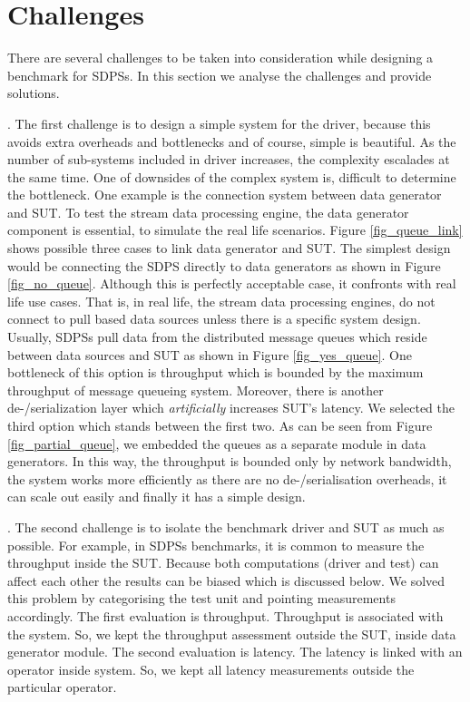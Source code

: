 \section{Challenges}
\label{chal}
There are several challenges to be taken into consideration while designing a benchmark for SDPSs. In this section we analyse the challenges and provide solutions.

. The first challenge is to design a simple system for the driver, because this avoids extra overheads and bottlenecks and of course, simple is beautiful. As the number of sub-systems included in driver increases, the complexity escalades at the same time. One of downsides of the complex system is, difficult to determine the bottleneck. One example is the connection system between data generator and SUT.  To test the stream data processing engine, the data generator component is essential, to simulate the real life scenarios. Figure \ref{fig_queue_link} shows possible three cases to link data generator and SUT. The simplest design would be connecting the SDPS directly to data generators as shown in Figure \ref{fig_no_queue}. Although this is perfectly acceptable case, it confronts with real life use cases. That is,  in real life, the stream data processing engines, do not connect to pull based data sources unless there is a specific system design. Usually, SDPSs pull data from the distributed message queues which reside between data sources and SUT as shown in Figure \ref{fig_yes_queue}. One bottleneck of this option is throughput which is bounded by the maximum throughput of message queueing system. Moreover, there is another  de-/serialization layer  which \textit{artificially} increases SUT's latency. We selected the third option which stands between the first two. As can be seen from Figure \ref{fig_partial_queue}, we embedded the queues as a separate module in data generators. In this way, the throughput is bounded only by network bandwidth, the system works more efficiently as there are no de-/serialisation overheads, it can scale out easily and finally it has a simple design. 


. The second challenge is to isolate the benchmark driver and SUT as much as possible. For example, in SDPSs benchmarks, it is common to measure the throughput inside the SUT. Because both computations (driver and test) can affect each other the results can be  biased  which is discussed below. We solved this problem by categorising the test unit and pointing measurements accordingly. The first evaluation is throughput. Throughput is associated with the system. So, we kept the throughput assessment outside the SUT, inside data generator module. The second evaluation is latency. The latency is linked with an operator inside system. So, we kept all latency measurements outside the particular operator.

